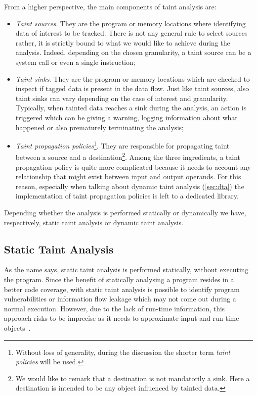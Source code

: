 \documentclass[LaM,binding=0.6cm]{sapthesis}
\begin{document}
From a higher perspective, the main components of taint analysis are: 
\begin{itemize}
\item \textit{Taint sources}. They are the program or memory locations where identifying data of interest to be tracked. There is not any general rule to select sources rather, it is strictly bound to what we would like to achieve during the analysis. Indeed, depending on the chosen granularity, a taint source can be a system call or even a single instruction;
\item \textit{Taint sinks}. They are the program or memory locations which are checked to inspect if tagged data is present in the data flow. Just like taint sources, also taint sinks can vary depending on the case of interest and granularity. Typically, when tainted data reaches a sink during the analysis, an action is triggered which can be giving a warning, logging information about what happened or also prematurely terminating the analysis;
\item \textit{Taint propagation policies}\footnote{Without loss of generality, during the discussion the shorter term \textit{taint policies} will be used.}. They are responsible for propagating taint between a source and a destination\footnote{We would like to remark that a destination is not mandatorily a sink. Here a destination is intended to be any object influenced by tainted data.}. Among the three ingredients, a taint propagation policy is quite more complicated because it needs to account any relationship that might exist between input and output operands. For this reason, especially when talking about dynamic taint analysis (\autoref{sec:dta}) the implementation of taint propagation policies is left to a dedicated library.
\end{itemize}
Depending whether the analysis is performed statically or dynamically we have, respectively, static taint analysis or dynamic taint analysis.

\subsection{Static Taint Analysis}
As the name says, static taint analysis is performed statically, without executing the program. Since the benefit of statically analysing a program resides in a better code coverage, with static taint analysis is possible to identify program vulnerabilities or information flow leakage which may not come out during a normal execution. However, due to the lack of run-time information, this approach risks to be imprecise as it needs to approximate input and run-time objects~\cite{arzt2014flowdroid}.
\end{document}
